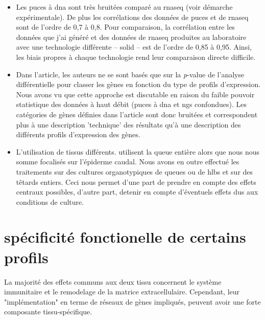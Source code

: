 \documentclass[../main.tex]{subfiles}
\begin{document}
\begin{itemize}
\item Les puces à \gls{dna} sont très bruitées comparé au \gls{rnaseq} (voir démarche expérimentale).
De plus les corrélations des données de puces et de \gls{rnaseq} sont de l'ordre de 0,7 à 0,8.
Pour comparaison, la corrélation entre les données que j'ai généré et des données de \gls{rnaseq} produites au laboratoire avec une technologie différente – \gls{solid} – est de l'ordre de 0,85 à 0,95.
Ainsi, les biais propres à chaque technologie rend leur comparaison directe difficile.
\item Dans l'article, les auteurs ne se sont basés que sur la \textit{p}-value de l'analyse différentielle pour classer les gènes en fonction du type de profils d'expression.
Nous avons vu que cette approche est discutable en raison du faible pouvoir statistique des données à haut débit (puces à \gls{dna} et \gls{ngs} confondues).
Les catégories de gènes définies dans l'article sont donc bruitées et correspondent plus à une description 'technique' des résultats qu'à une description des différents profils d'expression des gènes.
\item L'utilisation de tissus différents.
\citep{Kulkarni2011} utilisent la queue entière alors que nous nous somme focalisés sur l'épiderme caudal.
Nous avons en outre effectué les traitements sur des cultures organotypiques de queues ou de \glspl{hlb} et sur des têtards entiers.
Ceci nous permet d'une part de prendre en compte des effets centraux possibles, d'autre part, detenir en compte d'éventuels effets dus aux conditions de culture.
\end{itemize}




\section{spécificité fonctionelle de certains profils}

La majorité des effets communs aux deux tissu concernent le système immunitaire et le remodelage de la matrice extracellulaire.
Cependant, leur "implémentation" en terme de réseaux de gènes impliqués, peuvent avoir une forte composante tissu-spécifique.
\end{document}
